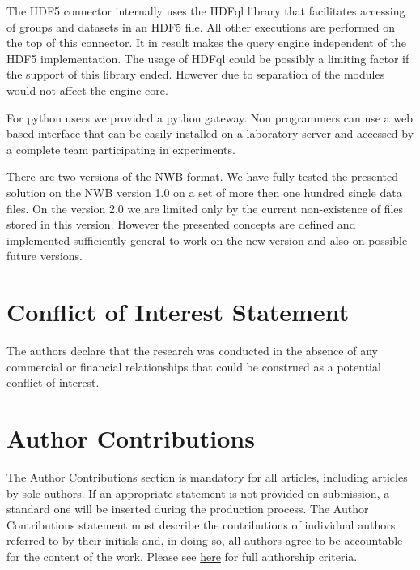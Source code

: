 \documentclass[utf8]{frontiersSCNS} %
\begin{document}
The HDF5 connector internally uses the HDFql library that facilitates accessing of groups and datasets in an HDF5 file. All other executions are performed on the top of this connector. It in result makes the query engine independent of the HDF5 implementation. The usage of HDFql could be possibly a limiting factor if the support of this library ended. However due to  separation of the modules would not affect the engine core. 

For python users we provided a python gateway. Non programmers can use a web based interface that can be easily installed on a laboratory server and accessed by a complete team participating in experiments.

There are two versions of the NWB format. We have fully tested the presented solution on the NWB version 1.0 on a set of more then one hundred single data files. On the version 2.0 we are limited only by the current non-existence of files stored in this version. However the presented concepts are defined and implemented sufficiently general to work on the new version and also on possible future versions.



\section*{Conflict of Interest Statement}

The authors declare that the research was conducted in the absence of any commercial or financial relationships that could be construed as a potential conflict of interest.

\section*{Author Contributions}

The Author Contributions section is mandatory for all articles, including articles by sole authors. If an appropriate statement is not provided on submission, a standard one will be inserted during the production process. The Author Contributions statement must describe the contributions of individual authors referred to by their initials and, in doing so, all authors agree to be accountable for the content of the work. Please see  \href{http://home.frontiersin.org/about/author-guidelines#AuthorandContributors}{here} for full authorship criteria.
\end{document}
